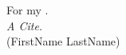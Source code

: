 \addchap*{}
	\begin{center}
		For my .\\[6cm]
		
		\textit{\glqq{}A Cite.\grqq{}}\\
		(FirstName LastName)
		
		\vspace{2cm}
	\end{center}